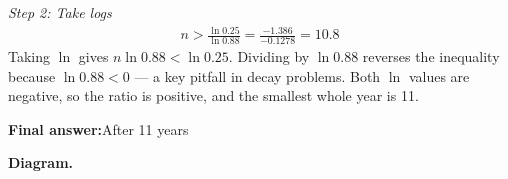 \documentclass[11pt]{article}
\begin{document}
\textit{Step 2: Take logs}
\[\begin{gathered}
n > \frac{\ln 0.25}{\ln 0.88} = \frac{-1.386}{-0.1278} = 10.8
\end{gathered}\]
Taking \( \ln \) gives \( n\ln 0.88 < \ln 0.25 \). Dividing by \( \ln 0.88 \) reverses the inequality because \( \ln 0.88 < 0 \) --- a key pitfall in decay problems. Both \( \ln \) values are negative, so the ratio is positive, and the smallest whole year is 11.

\begin{answerbox}
\textbf{Final answer:}\quad After 11 years
\end{answerbox}
\textbf{Diagram.}

\begin{center}
\end{center}
\end{document}

